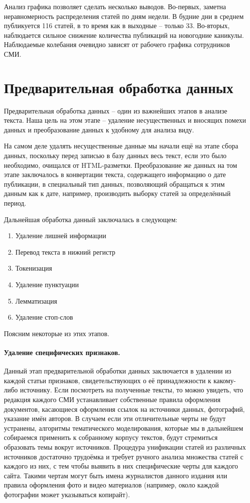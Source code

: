 Анализ графика позволяет сделать несколько выводов. Во-первых, заметна неравномерность распределения статей по дням недели. В будние дни в среднем публикуется 116 статей, в то время как в выходные -- только 33. Во-вторых, наблюдается сильное снижение количества публикаций на новогодние каникулы. Наблюдаемые колебания очевидно зависят от рабочего графика сотрудников СМИ.

\section{Предварительная обработка данных}

Предварительная обработка данных -- один из важнейших этапов в анализе текста. Наша цель на этом этапе -- удаление несущественных и вносящих помехи данных и преобразование данных к удобному для анализа виду.

На самом деле удалять несущественные данные мы начали ещё на этапе сбора данных, поскольку перед записью в базу данных весь текст, если это было необходимо, очищался от HTML-разметки. Преобразование же данных на том этапе заключалось в конвертации текста, содержащего информацию о дате публикации, в специальный тип данных, позволяющий обращаться к этим данным как к дате, например, производить выборку статей за определённый период.

Дальнейшая обработка данный заключалась в следующем:

\begin{enumerate}
\item Удаление лишней информации
\item Перевод текста в нижний регистр
\item Токенизация
\item Удаление пунктуации
\item Лемматизация
\item Удаление стоп-слов
\end{enumerate}
Поясним некоторые из этих этапов.

\paragraph{Удаление специфических признаков.}
Данный этап предварительной обработки данных заключается в удалении из каждой статьи признаков, свидетельствующих о её принадлежности к какому-либо источнику. Если посмотреть на полученные тексты, то можно увидеть, что редакция каждого СМИ устанавливает собственные правила оформления документов, касающиеся оформления ссылок на источники данных, фотографий, указание имён авторов. В случаем если эти отличительные черты не будут устранены, алгоритмы тематического моделирования, которые мы в дальнейшем собираемся применить к собранному корпусу текстов, будут стремиться образовать темы вокруг источников. Процедура унификации статей из различных источников достаточно трудоёмка и требует ручного анализа множества статей с каждого из них, с тем чтобы выявить в них специфические черты для каждого сайта. Такими чертам могут быть имена журналистов данного издания или правила оформления фото и видео материалов (например, около каждой фотографии может указываться копирайт).

